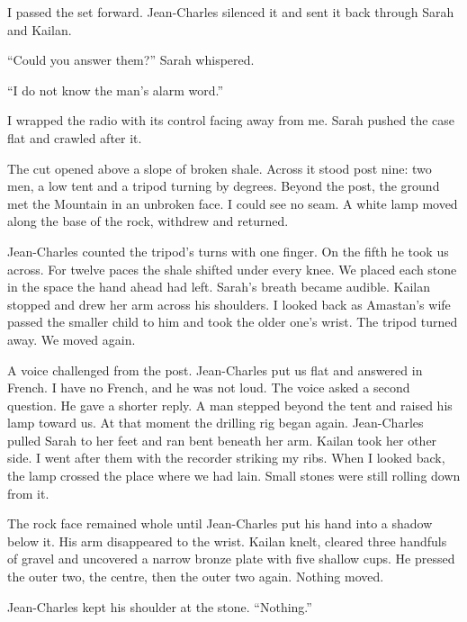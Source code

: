 I passed the set forward. Jean-Charles silenced it and sent it back through Sarah and Kailan.\par

``Could you answer them?'' Sarah whispered.\par

``I do not know the man's alarm word.''\par

I wrapped the radio with its control facing away from me. Sarah pushed the case flat and crawled after it.\par

The cut opened above a slope of broken shale. Across it stood post nine: two men, a low tent and a tripod turning by degrees. Beyond the post, the ground met the Mountain in an unbroken face. I could see no seam. A white lamp moved along the base of the rock, withdrew and returned.\par

Jean-Charles counted the tripod's turns with one finger. On the fifth he took us across. For twelve paces the shale shifted under every knee. We placed each stone in the space the hand ahead had left. Sarah's breath became audible. Kailan stopped and drew her arm across his shoulders. I looked back as Amastan's wife passed the smaller child to him and took the older one's wrist. The tripod turned away. We moved again.\par

A voice challenged from the post. Jean-Charles put us flat and answered in French. I have no French, and he was not loud. The voice asked a second question. He gave a shorter reply. A man stepped beyond the tent and raised his lamp toward us. At that moment the drilling rig began again. Jean-Charles pulled Sarah to her feet and ran bent beneath her arm. Kailan took her other side. I went after them with the recorder striking my ribs. When I looked back, the lamp crossed the place where we had lain. Small stones were still rolling down from it.\par

The rock face remained whole until Jean-Charles put his hand into a shadow below it. His arm disappeared to the wrist. Kailan knelt, cleared three handfuls of gravel and uncovered a narrow bronze plate with five shallow cups. He pressed the outer two, the centre, then the outer two again. Nothing moved.\par

Jean-Charles kept his shoulder at the stone. ``Nothing.''\par

